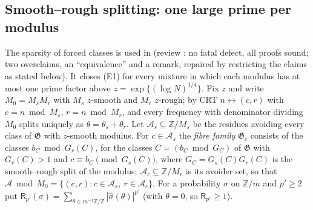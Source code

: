 \documentclass[10pt,reqno]{amsart}
\theoremstyle{definition}
\theoremstyle{remark}
\newcommand{\A}{\mathcal A}
\newcommand{\cG}{\mathfrak G}
\newcommand{\Z}{\mathbb Z}
\begin{document}
\subsection{Smooth--rough splitting: one large prime per modulus}\label{sec:smoothrough}
The sparsity of forced classes is used in \cite{LS3} (review \cite{LS3rev}:
no fatal defect, all proofs sound; two overclaims, an ``equivalence'' and a
remark, repaired by restricting the claims as stated below).  It
closes (E1) for every mixture in which each modulus has at most one prime
factor above $z=\exp\{(\log N)^{1/4}\}$.  Fix $z$ and write $M_0=M_sM_r$ with
$M_s$ $z$-smooth and $M_r$ $z$-rough; by CRT $n\leftrightarrow(c,r)$ with
$c=n\bmod M_s$, $r=n\bmod M_r$, and every frequency with denominator dividing
$M_0$ splits uniquely as $\theta=\theta_s+\theta_r$.  Let $\A_s\subseteq\Z/M_s$ be the
residues avoiding every class of $\cG$ with $z$-smooth modulus.  For
$c\in\A_s$ the \emph{fibre family} $\cG_c$ consists of the classes $b_C\bmod G_r(C)$,
for the classes $C=(b_C\bmod G_C)$ of $\cG$ with $G_r(C)>1$ and $c\equiv b_C\pmod{G_s(C)}$,
where $G_C=G_s(C)G_r(C)$ is the smooth--rough split of the modulus; $\A_c\subseteq\Z/M_r$
is its avoider set, so that $\A\bmod M_0=\{(c,r):c\in\A_s,\ r\in\A_c\}$.  For a
probability $\sigma$ on $\Z/m$ and $p'\geq2$ put
$\mathsf R_{p'}(\sigma)=\sum_{\theta\in m^{-1}\Z/\Z}|\hat\sigma(\theta)|^{p'}$ (with $\theta=0$, so $\mathsf R_{p'}\geq1$).
\end{document}
